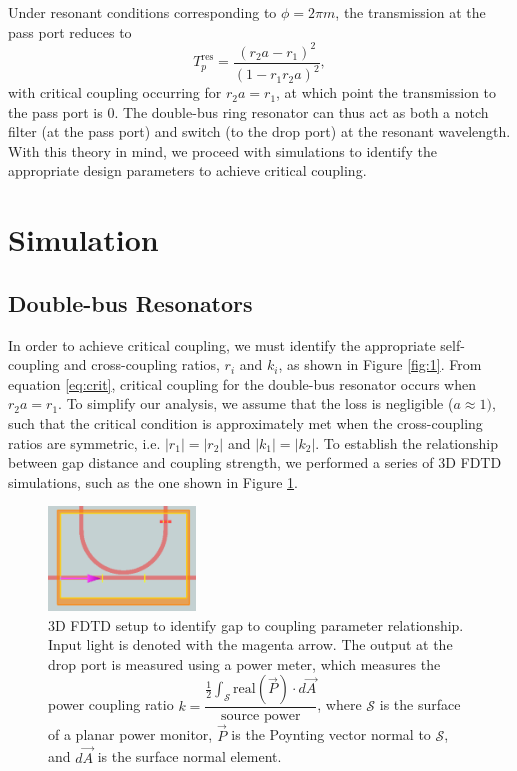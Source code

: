 \documentclass[letterpaper, 10 pt, conference]{ieeeconf}
\begin{document}
Under resonant conditions corresponding to $\phi = 2\pi m$, the transmission at the pass port reduces to 
\begin{equation}
    T_p^{\text{res}} = \dfrac{(r_2a-r_1)^2}{(1-r_1r_2a)^2},
    \label{eq:crit}
\end{equation}
with critical coupling occurring for $r_2a=r_1$, at which point the transmission to the pass port is $0$. The double-bus ring resonator can thus act as both a notch filter (at the pass port) and switch (to the drop port) at the resonant wavelength. With this theory in mind, we proceed with simulations to identify the appropriate design parameters to achieve critical coupling.


\section{Simulation}
\subsection*{Double-bus Resonators}
In order to achieve critical coupling, we must identify the appropriate self-coupling and cross-coupling ratios, $r_i$ and $k_i$, as shown in Figure \ref{fig:1}. From equation \eqref{eq:crit}, critical coupling for the double-bus resonator occurs when $r_2a = r_1$. To simplify our analysis, we assume that the loss is negligible ($a\approx 1)$, such that the critical condition is approximately met when the cross-coupling ratios are symmetric, i.e. $|r_1| = |r_2|$ and $|k_1| = |k_2|$. To establish the relationship between gap distance and coupling strength, we performed a series of 3D FDTD simulations, such as the one shown in Figure \ref{fig:sim3d}.

\begin{figure}[!ht]
    \centering
    \includegraphics[width = 0.35\textwidth]{gapdist.png}
    \caption{3D FDTD setup to identify gap to coupling parameter relationship. Input light is denoted with the magenta arrow. The output at the drop port is measured using a power meter, which measures the power coupling ratio $k =\dfrac{\frac{1}{2}\int_\mathcal{S}\text{real}(\vec{P})\cdot d\vec{A}}{\text{source power}}$, where $\mathcal{S}$ is the surface of a planar power monitor, $\vec{P}$ is the Poynting vector normal to $\mathcal{S}$, and $d\vec{A}$ is the surface normal element. }
    \label{fig:sim3d}
\end{figure} 
\end{document}
